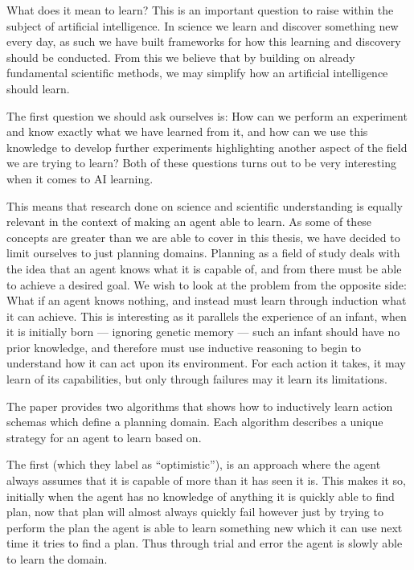 \documentclass[Master.tex]{subfiles}
\begin{document}
	What does it mean to learn? This is an important question to raise within the subject of artificial intelligence.
	In science we learn and discover something new every day, as such we have built frameworks for how this learning and discovery should be conducted. From this we believe that by building on already fundamental scientific methods, we may simplify how an artificial intelligence should learn.
	
	The first question we should ask ourselves is: How can we perform an experiment and know exactly what we have learned from it, 
	and how can we use this knowledge to develop further experiments highlighting another aspect of the field we are trying to learn?
	Both of these questions turns out to be very interesting when it comes to AI learning.
	
	This means that research done on science and scientific understanding is equally relevant in the context of making an agent able to learn.
	As some of these concepts are greater than we are able to cover in this thesis, we have decided to limit ourselves to just planning domains.	 
	Planning as a field of study deals with the idea that an agent knows what it is capable of, 
	and from there must be able to achieve a desired goal. 
	We wish to look at the problem from the opposite side: What if an agent knows nothing, and instead must learn through induction what it can achieve. 
	This is interesting as it parallels the experience of an infant, when it is initially born  --- ignoring genetic memory --- such an infant should have no prior knowledge, and therefore must use inductive reasoning to begin to understand how it can act upon its environment. For each action it takes, it may learn of its capabilities, but only through failures may it learn its limitations.
	
	The \cite{Walsh2008} paper provides two algorithms that shows how to inductively learn action schemas which define a planning domain. 
	Each algorithm describes a unique strategy for an agent to learn based on. 
	
	The first (which they label as ``optimistic''), is an approach where the agent always assumes that it is capable of more than it has seen it is. This makes it so, initially when the agent has no knowledge of anything it is quickly able to find plan, now that plan will almost always quickly fail however just by trying to perform the plan the agent is able to learn something new which it can use next time it tries to find a plan. Thus through trial and error the agent is slowly able to learn the domain.
	
\end{document}

